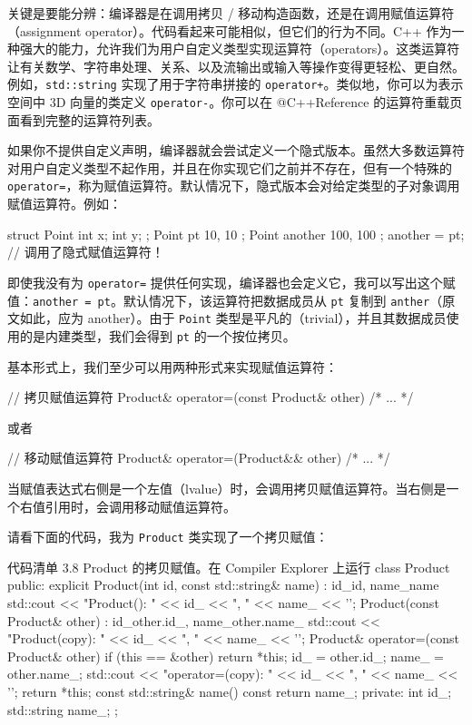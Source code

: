 关键是要能分辨：编译器是在调用拷贝 / 移动构造函数，还是在调用赋值运算符（assignment operator）。代码看起来可能相似，但它们的行为不同。C++ 作为一种强大的能力，允许我们为用户自定义类型实现运算符（operators）。这类运算符让有关数学、字符串处理、关系、以及流输出或输入等操作变得更轻松、更自然。例如，\texttt{std::string} 实现了用于字符串拼接的 \texttt{operator+}。类似地，你可以为表示空间中 3D 向量的类定义 \texttt{operator-}。你可以在 @C++Reference 的运算符重载页面看到完整的运算符列表。

如果你不提供自定义声明，编译器就会尝试定义一个隐式版本。虽然大多数运算符对用户自定义类型不起作用，并且在你实现它们之前并不存在，但有一个特殊的 \texttt{operator=}，称为赋值运算符。默认情况下，隐式版本会对给定类型的子对象调用赋值运算符。例如：

\begin{codebox}[cpp]
struct Point { int x; int y; };
Point pt { 10, 10 };
Point another { 100, 100 };
another = pt;
// 调用了隐式赋值运算符！
\end{codebox}

即使我没有为 \texttt{operator=} 提供任何实现，编译器也会定义它，我可以写出这个赋值：\texttt{another = pt}。默认情况下，该运算符把数据成员从 \texttt{pt} 复制到 \texttt{anther}（原文如此，应为 another）。由于 \texttt{Point} 类型是平凡的（trivial），并且其数据成员使用的是内建类型，我们会得到 \texttt{pt} 的一个按位拷贝。

基本形式上，我们至少可以用两种形式来实现赋值运算符：

\begin{codebox}[cpp]
// 拷贝赋值运算符
Product& operator=(const Product& other) { /* ... */}
\end{codebox}

或者

\begin{codebox}[cpp]
// 移动赋值运算符
Product& operator=(Product&& other) { /* ... */}
\end{codebox}

当赋值表达式右侧是一个左值（lvalue）时，会调用拷贝赋值运算符。当右侧是一个右值引用时，会调用移动赋值运算符。

请看下面的代码，我为 \texttt{Product} 类实现了一个拷贝赋值：

\begin{codeboxt}[cpp]{代码清单 3.8 Product 的拷贝赋值。在 Compiler Explorer 上运行}
class Product {
public:
explicit Product(int id, const std::string& name)
: id_{id}, name_{name} {
std::cout << "Product(): " << id_ << ", " << name_ << '\n';
}
Product(const Product& other) : id_{other.id_}, name_{other.name_} {
std::cout << "Product(copy): " << id_ << ", " << name_ << '\n';
}
Product& operator=(const Product& other) {
if (this == &other)
return *this;
id_ = other.id_;
name_ = other.name_;
std::cout << "operator=(copy): " << id_ << ", " << name_ << '\n';
return *this;
}
const std::string& name() const { return name_; }
private:
int id_;
std::string name_;
};
\end{codeboxt}

